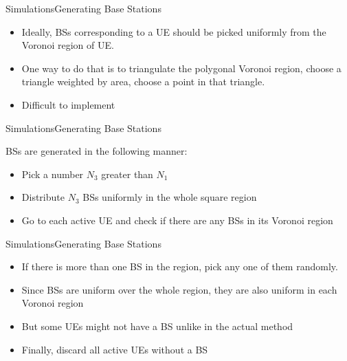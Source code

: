 \documentclass{beamer}
\begin{document}
\begin{frame}{Simulations}{Generating Base Stations}
\vspace{-1cm}
\begin{itemize}
\item Ideally, BSs corresponding to a UE should be picked uniformly from the Voronoi region of UE. 
\vspace{1cm}
\pause
\item One way to do that is to triangulate the polygonal Voronoi region, choose a triangle weighted by area, choose a point in that triangle.
\vspace{1cm}
\pause
\item Difficult to implement
\end{itemize}

\end{frame}

\begin{frame}{Simulations}{Generating Base Stations}

BSs are generated in the following manner:
\vspace{1cm}
\begin{itemize}
\item Pick a number $N_3$ greater than $N_1$
\vspace{1cm}
\item Distribute $N_3$ BSs uniformly in the whole square region
\vspace{1cm}
\pause
\item Go to each active UE and check if there are any BSs in its Voronoi region
\end{itemize} 

\end{frame}

\begin{frame}{Simulations}{Generating Base Stations}
\vspace{-1cm}
\begin{itemize}
\item If there is more than one BS in the region, pick any one of them randomly. 
\vspace{0.75cm}
\item Since BSs are uniform over the whole region, they are also uniform in each Voronoi region
\vspace{0.75cm}
\item But some UEs might not have a BS unlike in the actual method
\vspace{0.75cm}
\item Finally, discard all active UEs without a BS
\end{itemize}

\end{frame}
\end{document}
